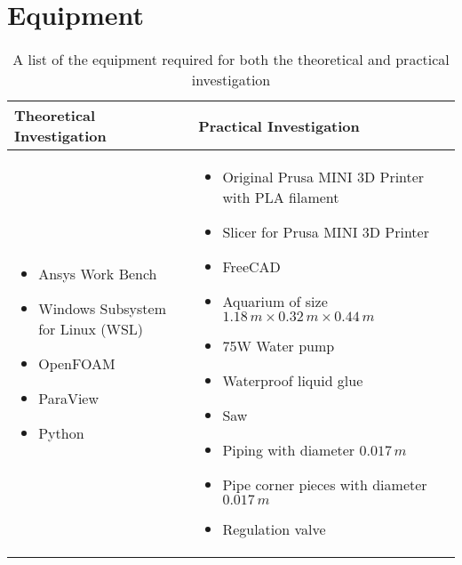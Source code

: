 \section{Equipment}
\begin{table}[H]
	\centering
	\begin{tabularx}{\textwidth}{|X|X|}
		\hline
		\textbf{Theoretical Investigation} & \textbf{Practical Investigation} \\
		\hline
		\begin{itemize}[leftmargin=1.5em, itemsep=2pt, topsep=0pt, label=--]
			\item Ansys Work Bench \parencite{noauthor_ansys_nodate}
			\item Windows Subsystem for Linux (WSL) \parencite{noauthor_windows_nodate}
			\item OpenFOAM \parencite{noauthor_openfoam_2024}
			\item ParaView \parencite{noauthor_paraview_nodate}
			\item Python \parencite{noauthor_python_2025}
		\end{itemize} 
		&
		\begin{itemize}[leftmargin=1.5em, itemsep=2pt, topsep=0pt, label=--]
			\item Original Prusa MINI 3D Printer with PLA filament \parencite{noauthor_prusa_nodate}
			\item Slicer for Prusa MINI 3D Printer \parencite{noauthor_prusaslicer_nodate}
			\item FreeCAD \parencite{noauthor_freecad_nodate}
			\item Aquarium of size $ 1.18\,m \times 0.32\,m \times 0.44\,m $
			\item 75W Water pump \parencite{noauthor_lnicez_nodate}
			\item Waterproof liquid glue
			\item Saw
			\item Piping with diameter \diameter $0.017\,m$ 
			\item Pipe corner pieces with diameter \diameter $0.017\,m$ 
			\item Regulation valve
		\end{itemize} \\
		\hline
	\end{tabularx}
	\caption{A list of the equipment required for both the theoretical and practical investigation}
	\label{tab:equipmentList1}
\end{table}

